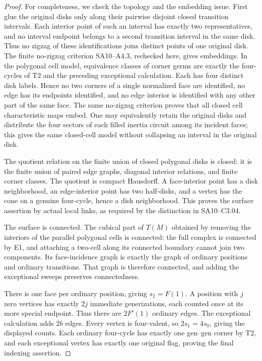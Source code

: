 \documentclass[11pt,a4paper]{article}
\begin{document}
\begin{proof}
For completeness, we check the topology and the embedding issue.
First glue the original disks only along their pairwise disjoint
closed transition intervals. Each interior point of such an interval
has exactly two representatives, and no interval endpoint belongs
to a second transition interval in the same disk. Thus no zigzag
of these identifications joins distinct points of one original disk.
The finite no-zigzag criterion SA10--A4.3, rechecked here, gives
embeddings. In the polygonal cell model, equivalence classes of corner
germs are exactly the four-cycles of T2 and the preceding exceptional
calculation. Each has four distinct disk labels. Hence no two corners
of a single normalized face are identified, no edge has its endpoints
identified, and no edge interior is identified with any other part
of the same face. The same no-zigzag criterion proves that all closed
cell characteristic maps embed. One may equivalently retain the
original disks and distribute the four sectors of each filled inertia
circuit among its incident faces; this gives the same closed-cell
model without collapsing an interval in the original disk.

The quotient relation on the finite union of closed polygonal disks is
closed: it is the finite union of paired edge graphs, diagonal interior
relations, and finite corner classes. The quotient is compact Hausdorff.
A face-interior point has a disk neighborhood, an edge-interior point
has two half-disks, and a vertex has the cone on a genuine four-cycle,
hence a disk neighborhood. This proves the surface assertion by actual
local links, as required by the distinction in SA10--C3.04.

The surface is connected. The cubical part of $T(M)$ obtained by
removing the interiors of the parallel polygonal cells is connected:
the full complex is connected by E1, and attaching a two-cell along
its connected boundary cannot join two components. Its face-incidence
graph is exactly the graph of ordinary positions and ordinary
transitions. That graph is therefore connected, and adding the
exceptional sweeps preserves connectedness.

There is one face per ordinary position, giving $s_2=F(1)$. A position
with $j$ zero vertices has exactly $2j$ immediate generizations,
each counted once at its more special endpoint. Thus there are
$2F'(1)$ ordinary edges. The exceptional calculation adds $2b$ edges.
Every vertex is four-valent, so $2s_1=4s_0$, giving the displayed
counts. Each ordinary four-cycle has exactly one gen--gen corner by
T2, and each exceptional vertex has exactly one original flag, proving
the final indexing assertion.


\end{proof}
\end{document}
